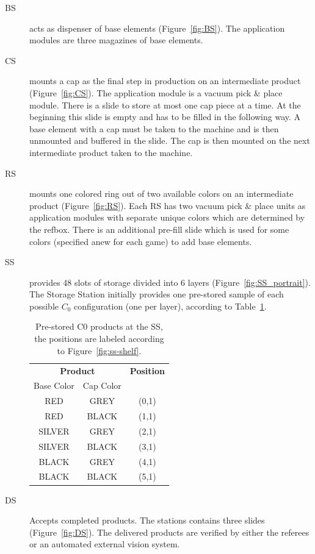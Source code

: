 \documentclass[12pt,twoside]{article}
\newcommand{\reffig}[1]{Figure~\ref{#1}}
\newcommand{\reftab}[1]{Table~\ref{#1}}
\begin{document}
\begin{description}
\item[\acf{BS}] acts as dispenser of base elements
  (\reffig{fig:BS}). The application modules are three magazines of
  base elements.

\item[\acf{CS}] mounts a cap as the final step in production
  on an intermediate product (\reffig{fig:CS}). The application module
  is a vacuum pick \& place module. There is a slide to store at most
  one cap piece at a time. At the beginning this slide is empty and
  has to be filled in the following way.  A base element with a cap
  must be taken to the machine and is then unmounted and buffered in
  the slide. The cap is then mounted on the next intermediate product
  taken to the machine.

\item[\acf{RS}] mounts one colored ring out of two available
  colors on an intermediate product (\reffig{fig:RS}). Each \ac{RS} has two
  vacuum pick \& place units as application modules with separate
  unique colors which are determined by the \ac{refbox}. There is an
  additional pre-fill slide which is used for some colors (specified
  anew for each game) to add base elements.

\item[\acf{SS}] provides 48 slots of storage divided into
  6 layers (\reffig{fig:SS_portrait}).
  The Storage Station initially provides one pre-stored sample of each possible
  $C_0$ configuration (one per layer), according to \reftab{tab:ss-c0-init}.
\begin{table}
  \begin{tabular}{c|c||c}
    \hline
    \multicolumn{2}{c||}{\bf{Product}} &
    \multicolumn{1}{c}{\bf{Position}} \\\cline{1-3}
    Base Color & Cap Color  & \\\hline
    RED    & GREY  & (0,1) \\
    RED    & BLACK & (1,1) \\
    SILVER & GREY  & (2,1) \\
    SILVER & BLACK & (3,1) \\
    BLACK  & GREY  & (4,1) \\
    BLACK  & BLACK & (5,1) \\
  \end{tabular}
  \caption{Pre-stored C0 products at the \ac{SS}, the positions are labeled
    according to \reffig{fig:ss-shelf}.}
  \label{tab:ss-c0-init}
\end{table}

\item[\acf{DS}] Accepts completed products. The stations contains
  three slides (\reffig{fig:DS}). The delivered products are verified by either
  the referees or an automated external vision system.
\end{description}
\end{document}
